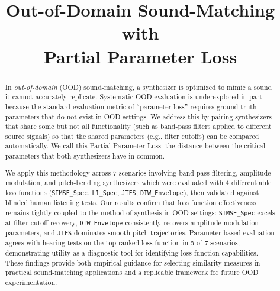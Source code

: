 \documentclass{article}
\title{Out-of-Domain Sound-Matching with\\ Partial Parameter Loss}
\newcommand{\SIMSESpec}{\texttt{SIMSE\_\allowbreak Spec}\xspace}
\newcommand{\LoneSpec}{\texttt{L1\_\allowbreak Spec}\xspace}
\newcommand{\JTFS}{\texttt{JTFS}\xspace}
\newcommand{\DTWEnv}{\texttt{DTW\_\allowbreak Envelope}\xspace}
\begin{document}


\maketitle



\begin{abstract}


In \textit{out-of-domain} (OOD) sound-matching, a synthesizer is optimized to mimic a sound it cannot accurately replicate. Systematic OOD evaluation is underexplored in part because the standard evaluation metric of ``parameter loss'' requires ground-truth parameters that do not exist in OOD settings. We address this by pairing synthesizers that share some but not all functionality (such as band-pass filters applied to different source signals) so that the shared parameters (e.g., filter cutoffs) can be compared automatically. We call this Partial Parameter Loss: the distance between the critical parameters that both synthesizers have in common.

We apply this methodology across 7 scenarios involving band-pass filtering, amplitude modulation, and pitch-bending synthesizers which were evaluated with 4 differentiable loss functions (\SIMSESpec, \LoneSpec, \JTFS, \DTWEnv), then validated against blinded human listening tests. Our results confirm that loss function effectiveness remains tightly coupled to the method of synthesis in OOD settings: \SIMSESpec excels at filter cutoff recovery, \DTWEnv consistently recovers amplitude modulation parameters, and \JTFS dominates smooth pitch trajectories. Parameter-based evaluation agrees with hearing tests on the top-ranked loss function in 5 of 7 scenarios, demonstrating utility as a diagnostic tool for identifying loss function capabilities. These findings provide both empirical guidance for selecting similarity measures in practical sound-matching applications and a replicable framework for future OOD experimentation.

\end{abstract}
\end{document}
